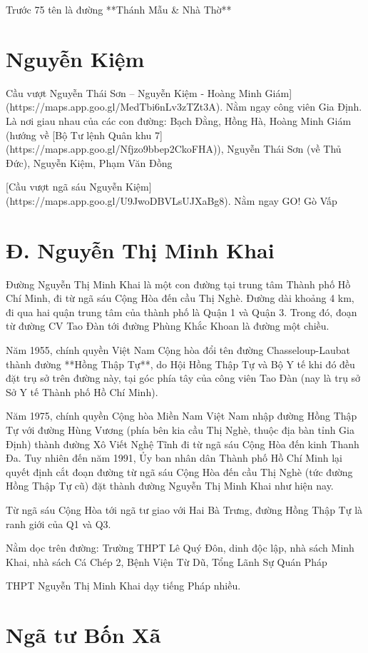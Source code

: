 Trước 75 tên là đường **Thánh Mẫu \& Nhà Thờ**

\section{Nguyễn Kiệm}

Cầu vượt Nguyễn Thái Sơn – Nguyễn Kiệm - Hoàng Minh Giám](https://maps.app.goo.gl/MedTbi6nLv3zTZt3A). Nằm ngay công viên Gia Định. Là nơi giau nhau của các con đường: Bạch Đằng, Hồng Hà, Hoàng Minh Giám (hướng về [Bộ Tư lệnh Quân khu 7](https://maps.app.goo.gl/Nfjzo9bbep2CkoFHA)), Nguyễn Thái Sơn (về Thủ Đức), Nguyễn Kiệm, Phạm Văn Đồng

[Cầu vượt ngã sáu Nguyễn Kiệm](https://maps.app.goo.gl/U9JwoDBVLsUJXaBg8). Nằm ngay GO! Gò Vấp

\section{Đ. Nguyễn Thị Minh Khai}

Đường Nguyễn Thị Minh Khai là một con đường tại trung tâm Thành phố Hồ Chí Minh, đi từ ngã sáu Cộng Hòa đến cầu Thị Nghè. Đường dài khoảng 4 km, đi qua hai quận trung tâm của thành phố là Quận 1 và Quận 3. Trong đó, đoạn từ đường CV Tao Đàn tới đường Phùng Khắc Khoan là đường một chiều.

Năm 1955, chính quyền Việt Nam Cộng hòa đổi tên đường Chasseloup-Laubat thành đường **Hồng Thập Tự**, do Hội Hồng Thập Tự và Bộ Y tế khi đó đều đặt trụ sở trên đường này, tại góc phía tây của công viên Tao Đàn (nay là trụ sở Sở Y tế Thành phố Hồ Chí Minh).

Năm 1975, chính quyền Cộng hòa Miền Nam Việt Nam nhập đường Hồng Thập Tự với đường Hùng Vương (phía bên kia cầu Thị Nghè, thuộc địa bàn tỉnh Gia Định) thành đường Xô Viết Nghệ Tĩnh đi từ ngã sáu Cộng Hòa đến kinh Thanh Đa. Tuy nhiên đến năm 1991, Ủy ban nhân dân Thành phố Hồ Chí Minh lại quyết định cắt đoạn đường từ ngã sáu Cộng Hòa đến cầu Thị Nghè (tức đường Hồng Thập Tự cũ) đặt thành đường Nguyễn Thị Minh Khai như hiện nay.

Từ ngã sáu Cộng Hòa tới ngã tư giao với Hai Bà Trưng, đường Hồng Thập Tự là ranh giới của Q1 và Q3.

Nằm dọc trên đường: Trường THPT Lê Quý Đôn, dinh độc lập, nhà sách Minh Khai, nhà sách Cá Chép 2, Bệnh Viện Từ Dũ, Tổng Lãnh Sự Quán Pháp

THPT Nguyễn Thị Minh Khai dạy tiếng Pháp nhiều.

\section{Ngã tư Bốn Xã}

